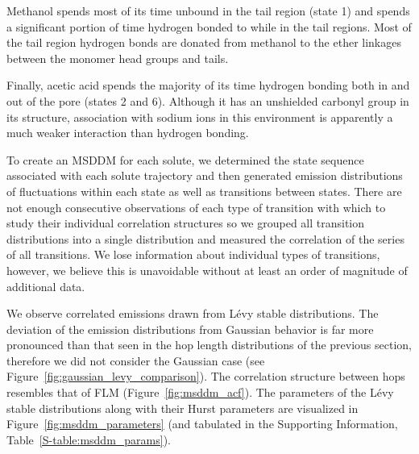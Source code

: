 \documentclass{article}
\begin{document}
  Methanol spends most of its time unbound in the tail region (state 1) and spends a 
  significant portion of time hydrogen bonded to while in the tail regions.
  Most of the tail region hydrogen bonds are donated from methanol to the ether
  linkages between the monomer head groups and tails.
  
  Finally, acetic acid spends the majority of its time hydrogen bonding both in and out
  of the pore (states 2 and 6). Although it has an unshielded carbonyl group in its
  structure, association with sodium ions in this environment is apparently a much 
  weaker interaction than hydrogen bonding.
  
  To create an MSDDM for each solute, we determined the state sequence associated
  with each solute trajectory and then generated emission distributions of fluctuations
  within each state as well as transitions between states. There are not enough 
  consecutive observations of each type of transition with which to study their 
  individual correlation structures so we grouped all transition distributions
  into a single distribution and measured the correlation of the series of all 
  transitions. We lose information about individual types of transitions, however, 
  we believe this is unavoidable without at least an order of magnitude of additional data.
  
  We observe correlated emissions drawn from L\'evy stable distributions. The 
  deviation of the emission distributions from Gaussian behavior is far more pronounced
  than that seen in the hop length distributions of the previous section, therefore we 
  did not consider the Gaussian case (see Figure~\ref{fig:gaussian_levy_comparison}).
  The correlation structure between hops resembles that of FLM (Figure~\ref{fig:msddm_acf}).
  The parameters of the L\'evy stable distributions along with their Hurst parameters 
  are visualized in Figure~\ref{fig:msddm_parameters} (and tabulated in the Supporting
  Information, Table~\ref{S-table:msddm_params}). 
  
\end{document}
